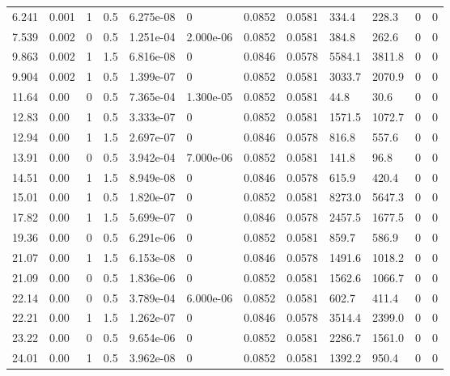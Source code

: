 \documentclass[preview]{standalone}
\begin{document}
{{\begin{tabular}{L{1.2cm}C{1.2cm} C{0.3cm}C{0.5cm} C{1.4cm}C{1.4cm} C{1.4cm}C{1.4cm} C{1.6cm}C{1.6cm} C{1.6cm}C{1.6cm}}
  6.241  &  0.001  & 1     & 0.5 &  6.275e-08  & 0  &  0.0852&   0.0581& 334.4 & 228.3   &  0 & 0  \\ 
  7.539  &  0.002  & 0     & 0.5 &  1.251e-04  & 2.000e-06  &  0.0852&   0.0581& 384.8 & 262.6   &  0 & 0  \\ 
  9.863  &  0.002  & 1     & 1.5 &  6.816e-08  & 0  &  0.0846&   0.0578& 5584.1 & 3811.8   &  0 & 0  \\ 
  9.904  &  0.002  & 1     & 0.5 &  1.399e-07  & 0  &  0.0852&   0.0581& 3033.7 & 2070.9   &  0 & 0  \\ 
  11.64  &  0.00  & 0     & 0.5 &  7.365e-04  & 1.300e-05  &  0.0852&   0.0581& 44.8 & 30.6   &  0 & 0  \\ 
  12.83  &  0.00  & 1     & 0.5 &  3.333e-07  & 0  &  0.0852&   0.0581& 1571.5 & 1072.7   &  0 & 0  \\ 
  12.94  &  0.00  & 1     & 1.5 &  2.697e-07  & 0  &  0.0846&   0.0578& 816.8 & 557.6   &  0 & 0  \\ 
  13.91  &  0.00  & 0     & 0.5 &  3.942e-04  & 7.000e-06  &  0.0852&   0.0581& 141.8 & 96.8   &  0 & 0  \\ 
  14.51  &  0.00  & 1     & 1.5 &  8.949e-08  & 0  &  0.0846&   0.0578& 615.9 & 420.4   &  0 & 0  \\ 
  15.01  &  0.00  & 1     & 0.5 &  1.820e-07  & 0  &  0.0852&   0.0581& 8273.0 & 5647.3   &  0 & 0  \\ 
  17.82  &  0.00  & 1     & 1.5 &  5.699e-07  & 0  &  0.0846&   0.0578& 2457.5 & 1677.5   &  0 & 0  \\ 
  19.36  &  0.00  & 0     & 0.5 &  6.291e-06  & 0  &  0.0852&   0.0581& 859.7 & 586.9   &  0 & 0  \\ 
  21.07  &  0.00  & 1     & 1.5 &  6.153e-08  & 0  &  0.0846&   0.0578& 1491.6 & 1018.2   &  0 & 0  \\ 
  21.09  &  0.00  & 0     & 0.5 &  1.836e-06  & 0  &  0.0852&   0.0581& 1562.6 & 1066.7   &  0 & 0  \\ 
  22.14  &  0.00  & 0     & 0.5 &  3.789e-04  & 6.000e-06  &  0.0852&   0.0581& 602.7 & 411.4   &  0 & 0  \\ 
  22.21  &  0.00  & 1     & 1.5 &  1.262e-07  & 0  &  0.0846&   0.0578& 3514.4 & 2399.0   &  0 & 0  \\ 
  23.22  &  0.00  & 0     & 0.5 &  9.654e-06  & 0  &  0.0852&   0.0581& 2286.7 & 1561.0   &  0 & 0  \\ 
  24.01  &  0.00  & 1     & 0.5 &  3.962e-08  & 0  &  0.0852&   0.0581& 1392.2 & 950.4   &  0 & 0  \\ 

\end{tabular}}}
\end{document}
